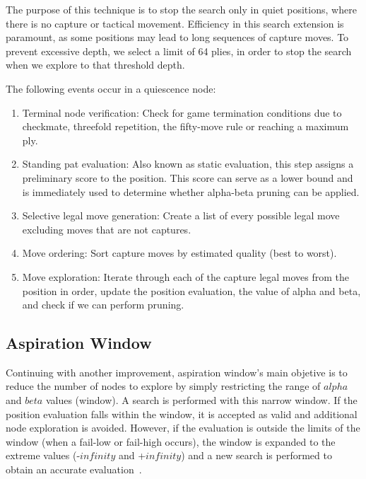 \vspace{1em}

\noindent The purpose of this technique is to stop the search only in quiet positions, where there is no capture or tactical movement. Efficiency in this search extension is paramount, as some positions may lead to long sequences of capture moves. To prevent excessive depth, we select a limit of 64 plies, in order to stop the search when we explore to that threshold depth.

\vspace{1em}

\noindent The following events occur in a quiescence node:

\begin{enumerate}
    \item Terminal node verification: Check for game termination conditions due to checkmate, threefold repetition, the fifty-move rule or reaching a maximum ply.
    \item Standing pat evaluation: Also known as static evaluation, this step assigns a preliminary score to the position. This score can serve as a lower bound and is immediately used to determine whether alpha-beta pruning can be applied.
    \item Selective legal move generation: Create a list of every possible legal move excluding moves that are not captures.
    \item Move ordering: Sort capture moves by estimated quality (best to worst).
    \item Move exploration: Iterate through each of the capture legal moves from the position in order, update the position evaluation, the value of alpha and beta, and check if we can perform pruning.
\end{enumerate}

\subsection{Aspiration Window}\label{sec:aspiration-window}

Continuing with another improvement, aspiration window's main objetive is to reduce the number of nodes to explore by simply restricting the range of $alpha$ and $beta$ values (window). A search is performed with this narrow window. If the position evaluation falls within the window, it is accepted as valid and additional node exploration is avoided. However, if the evaluation is outside the limits of the window (when a fail-low or fail-high occurs), the window is expanded to the extreme values (-$infinity$ and +$infinity$) and a new search is performed to obtain an accurate evaluation~\cite{AspirationWindow}.


